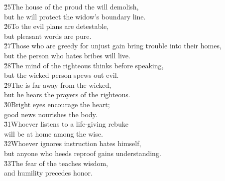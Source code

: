 \begin{poetry}
\poeml \v{25}The house of the proud the  will demolish, \\
\poemll    but he will protect the widow's boundary line. \\
\poeml \v{26}To the  evil plans are detestable, \\
\poemll    but pleasant words are pure. \\
\poeml \v{27}Those who are greedy for unjust gain bring trouble into their homes, \\
\poemll    but the person who hates bribes will live. \\
\poeml \v{28}The mind of the righteous thinks before speaking, \\
\poemll    but the wicked person spews out evil. \\
\poeml \v{29}The  is far away from the wicked, \\
\poemll    but he hears the prayers of the righteous. \\
\poeml \v{30}Bright eyes encourage the heart; \\
\poemll    good news nourishes the body. \\
\poeml \v{31}Whoever listens to a life-giving rebuke \\
\poemll    will be at home among the wise. \\
\poeml \v{32}Whoever ignores instruction hates himself, \\
\poemll    but anyone who heeds reproof gains understanding. \\
\poeml \v{33}The fear of the  teaches wisdom, \\
\poemll    and humility precedes honor.
\end{poetry}

